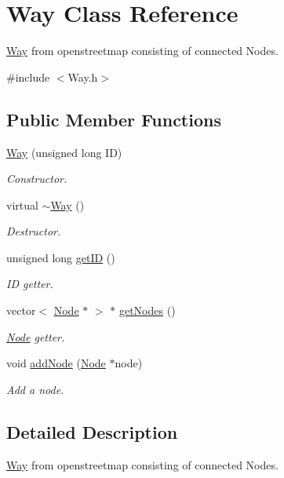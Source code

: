 \hypertarget{classWay}{\section{Way Class Reference}
\label{classWay}
}


\hyperlink{classWay}{Way} from openstreetmap consisting of connected Nodes.  




{\ttfamily \#include $<$Way.\+h$>$}

\subsection*{Public Member Functions}
\begin{DoxyCompactItemize}
\item 
\hyperlink{classWay_ab4715d81653126b9c799aff81facf800}{Way} (unsigned long I\+D)
\begin{DoxyCompactList}\small\item\em Constructor. \end{DoxyCompactList}\item 
virtual \hyperlink{classWay_aa118212423fa0f1b5c33663e1e0d0b74}{$\sim$\+Way} ()
\begin{DoxyCompactList}\small\item\em Destructor. \end{DoxyCompactList}\item 
unsigned long \hyperlink{classWay_a860214f9a48695b794298c29c829fc40}{get\+I\+D} ()
\begin{DoxyCompactList}\small\item\em I\+D getter. \end{DoxyCompactList}\item 
vector$<$ \hyperlink{classNode}{Node} $\ast$ $>$ $\ast$ \hyperlink{classWay_a690c2eeae8128b5f8d201bba41570d71}{get\+Nodes} ()
\begin{DoxyCompactList}\small\item\em \hyperlink{classNode}{Node} getter. \end{DoxyCompactList}\item 
void \hyperlink{classWay_ada3668577e62311e7c56d2575e5edd00}{add\+Node} (\hyperlink{classNode}{Node} $\ast$node)
\begin{DoxyCompactList}\small\item\em Add a node. \end{DoxyCompactList}\end{DoxyCompactItemize}


\subsection{Detailed Description}
\hyperlink{classWay}{Way} from openstreetmap consisting of connected Nodes. 

